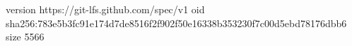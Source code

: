 version https://git-lfs.github.com/spec/v1
oid sha256:783e5b3fc91e174d7de8516f2f902f50e16338b353230f7c00d5ebd78176dbb6
size 5566
